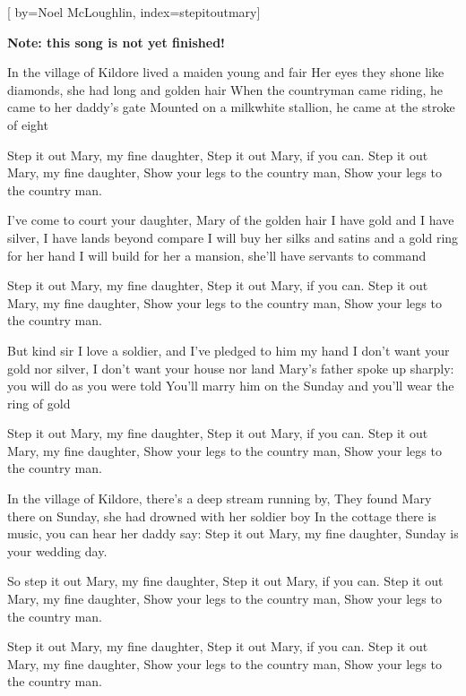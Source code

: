 
[%
    by={Noel McLoughlin},
    index={stepitoutmary}]


    \label{stepitoutmary}

    \textbf{Note: this song is not yet finished!}

    \beginverse
        In the village of Kildore lived a maiden young and fair
        Her eyes they shone like diamonds, she had long and golden hair
        When the countryman came riding, he came to her daddy's gate
        Mounted on a milkwhite stallion, he came at the stroke of eight
    \endverse

    \beginchorus
        Step it out Mary, my fine daughter,
        Step it out Mary, if you can.
        Step it out Mary, my fine daughter,
        Show your legs to the country man,
        Show your legs to the country man.
    \endchorus

    \beginverse
        I've come to court your daughter, Mary of the golden hair
        I have gold and I have silver, I have lands beyond compare
        I will buy her silks and satins and a gold ring for her hand
        I will build for her a mansion, she'll have servants to command
    \endverse

    \beginchorus
        Step it out Mary, my fine daughter,
        Step it out Mary, if you can.
        Step it out Mary, my fine daughter,
        Show your legs to the country man,
        Show your legs to the country man.
    \endchorus

    \beginverse
        But kind sir I love a soldier, and I've pledged to him my hand
        I don't want your gold nor silver, I don't want your house nor land
        Mary's father spoke up sharply: you will do as you were told
        You'll marry him on the Sunday and you'll wear the ring of gold
    \endverse

    \beginchorus
        Step it out Mary, my fine daughter,
        Step it out Mary, if you can.
        Step it out Mary, my fine daughter,
        Show your legs to the country man,
        Show your legs to the country man.
    \endchorus

    \beginverse
        In the village of Kildore, there's a deep stream running by,
        They found Mary there on Sunday, she had drowned with her soldier boy
        In the cottage there is music, you can hear her daddy say:
        Step it out Mary, my fine daughter, Sunday is your wedding day.
    \endverse

    \beginchorus
        So step it out Mary, my fine daughter,
        Step it out Mary, if you can.
        Step it out Mary, my fine daughter,
        Show your legs to the country man,
        Show your legs to the country man.
    \endchorus

    \beginchorus
        Step it out Mary, my fine daughter,
        Step it out Mary, if you can.
        Step it out Mary, my fine daughter,
        Show your legs to the country man,
        Show your legs to the country man.
    \endchorus
\endsong
